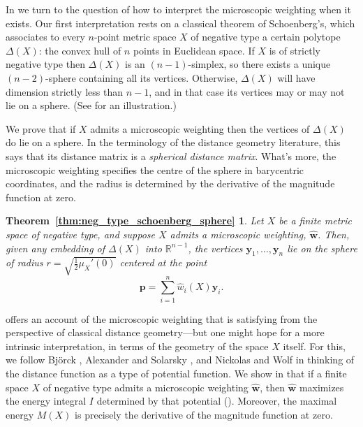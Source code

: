 \documentclass[a4paper, oneside, reqno]{amsart}
\newtheorem*{thmneg_type_schoenberg_sphere}{Theorem~\ref{thm:neg_type_schoenberg_sphere}}
\theoremstyle{definition}
\theoremstyle{remark}
\numberwithin{equation}{section}
\newcommand{\demph}[1]{\emph{#1}}
\renewcommand{\vec}{\mathbf}
\newcommand{\micro}{\widehat{\vec{w}}}
\begin{document}
In  we turn to the question of how to interpret the microscopic weighting when it exists. Our first interpretation rests on a classical theorem of Schoenberg's, which associates to every \(n\)-point metric space \(X\) of negative type a certain polytope \(\Delta(X)\): the convex hull of \(n\) points in Euclidean space. If \(X\) is of strictly negative type then \(\Delta(X)\) is an \((n-1)\)-simplex, so there exists a unique \((n-2)\)-sphere containing all its vertices. Otherwise, \(\Delta(X)\) will have dimension strictly less than \(n-1\), and in that case its vertices may or may not lie on a sphere. (See  for an illustration.) 

We prove that if \(X\) admits a microscopic weighting then the vertices of \(\Delta(X)\) do lie on a sphere. In the terminology of the distance geometry literature, this says that its distance matrix is a \demph{spherical distance matrix}. What's more, the microscopic weighting specifies the centre of the sphere in barycentric coordinates, and the radius is determined by the derivative of the magnitude function at zero.

\begin{thmneg_type_schoenberg_sphere}
Let \(X\) be a finite metric space of negative type, and suppose \(X\) admits a microscopic weighting, \(\micro\). Then, given any embedding of \(\Delta(X)\) into \(\mathbb{R}^{n-1}\), the vertices \(\vec{y}_1, \ldots, \vec{y}_n\) lie on the sphere of radius \(r = \sqrt{\frac{1}{2} \mu_X'(0)}\) centered at the point
\begin{equation*}
\vec{p} = \sum_{i=1}^n \widehat{w}_i(X) \vec{y}_i.
\end{equation*}
\end{thmneg_type_schoenberg_sphere}

 offers an account of the microscopic weighting that is satisfying from the perspective of classical distance geometry---but one might hope for a more intrinsic interpretation, in terms of the geometry of the space \(X\) itself. For this, we follow Bj\"orck \cite{Bjoerck:Distributions-of-positive-mass}, Alexander and Solarsky \cite{Alexander-Stolarsky:Extremal-problems}, and Nickolas and Wolf \cite{Nickolas-Wolf:distance-geometry-I, Nickolas-Wolf:distance-geometry-II, Nickolas-Wolf:distance-geometry-III} in thinking of the distance function as a type of potential function.  We show in  that if a finite space \(X\) of negative type admits a microscopic weighting \(\micro\), then \(\micro\) maximizes the energy integral \(I\) determined by that potential (). Moreover, the maximal energy \(M(X)\) is precisely the derivative of the magnitude function at zero.
\end{document}
